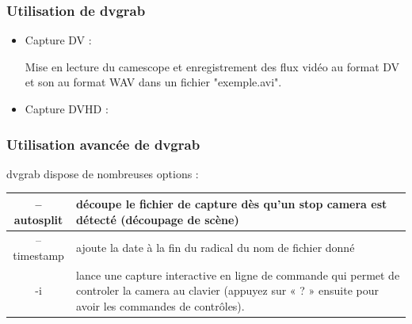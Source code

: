 \begin{frame}
\frametitle{Utilisation de dvgrab}
\begin{itemize}
\item Capture DV :

Mise en lecture du camescope et enregistrement des flux vidéo au format DV et son au format WAV dans un fichier "exemple.avi". 

\item Capture DVHD :

\end{itemize}
\end{frame}

\begin{frame}
\frametitle{Utilisation avancée de dvgrab}
dvgrab dispose de nombreuses options :
\begin{tabular}{|c|p{8cm}|}
\hline
--autosplit & découpe le fichier de capture dès qu'un stop camera est détecté (découpage de scène) \\
\hline
--timestamp & ajoute la date à la fin du radical du nom de fichier donné\\
\hline
-i & lance une capture interactive en ligne de commande qui permet de controler la camera au clavier (appuyez sur « ? » ensuite pour avoir les commandes de contrôles). \\
\hline
 \end{tabular}
 \end{frame}
 
